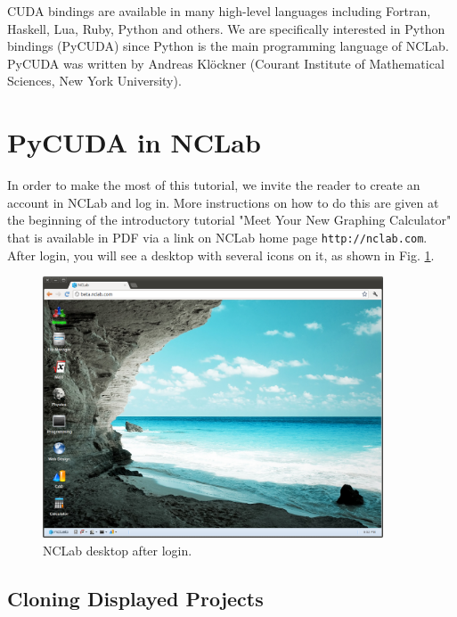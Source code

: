 \documentclass{article}
\begin{document}
CUDA bindings are available in many high-level languages including Fortran,
Haskell, Lua, Ruby, Python and others. We are specifically interested 
in Python bindings (PyCUDA) since Python is the main programming language 
of NCLab. PyCUDA was written by Andreas Kl\"ockner (Courant Institute 
of Mathematical Sciences, New York University).





\section{PyCUDA in NCLab}

In order to make the most of this tutorial, we invite the 
reader to create an account in NCLab and log in. More instructions 
on how to do this are given at the beginning of the introductory 
tutorial "Meet Your New Graphing Calculator" that is available in 
PDF via a link on NCLab home page {\tt http://nclab.com}. \\

\noindent
After login, you will see a desktop with several icons on it,
as shown in Fig. \ref{fig:desktop}. 

\begin{figure}[!ht]
\begin{center}
\includegraphics[width=0.9\textwidth]{img/desktop.png}
\end{center}
\caption{NCLab desktop after login.}
\label{fig:desktop}
\end{figure}

\subsection{Cloning Displayed Projects}
\end{document}
